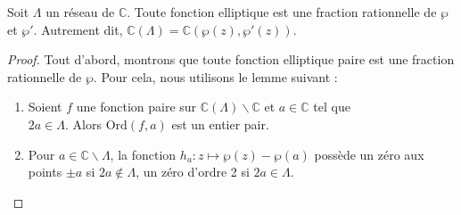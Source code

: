\documentclass[a4paper]{article}
\begin{document}
\begin{theorem} \label{theo6}
Soit $\Lambda$ un réseau de $\mathbb{C}$. Toute fonction elliptique est une fraction rationnelle de $\wp$ et $\wp'$. Autrement dit, $\mathbb{C}(\Lambda)=\mathbb{C}(\wp(z),\wp'(z))$.
\end{theorem}



\begin{proof}
Tout d'abord, montrons que toute fonction elliptique paire est une fraction rationnelle de $\wp$. Pour cela, nous utilisons le lemme suivant :
\begin{lem}
\begin{enumerate}
\item Soient $f$ une fonction paire sur $\mathbb{C}(\Lambda)\backslash \mathbb{C}$ et $a \in \mathbb{C}$ tel que \\$2a \in \Lambda$. Alors $\text{Ord}(f,a)$ est un entier pair.
\item 
Pour $a \in \mathbb{C} \backslash \Lambda$, la fonction $h_a : z \mapsto \wp(z) - \wp(a)$ possède un zéro aux points $\pm a$ si $2a \not \in \Lambda$, un zéro d'ordre 2 si $2a \in \Lambda$.
\end{enumerate}
\end{lem}


\end{proof}
\end{document}
